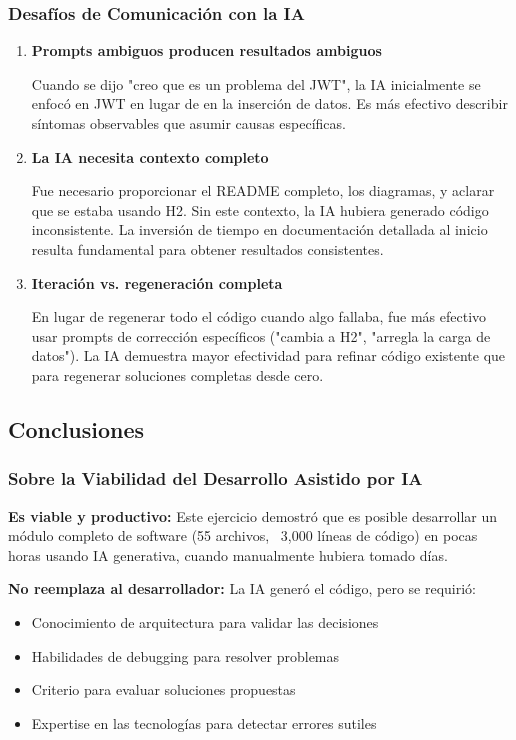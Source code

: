 \documentclass[11pt,a4paper]{article}
\begin{document}
\subsubsection{Desafíos de Comunicación con la IA}

\begin{enumerate}
    \item \textbf{Prompts ambiguos producen resultados ambiguos}
    
    Cuando se dijo "creo que es un problema del JWT", la IA inicialmente se enfocó en JWT en lugar de en la inserción de datos. Es más efectivo describir síntomas observables que asumir causas específicas.
    
    \item \textbf{La IA necesita contexto completo}
    
    Fue necesario proporcionar el README completo, los diagramas, y aclarar que se estaba usando H2. Sin este contexto, la IA hubiera generado código inconsistente. La inversión de tiempo en documentación detallada al inicio resulta fundamental para obtener resultados consistentes.
    
    \item \textbf{Iteración vs. regeneración completa}
    
    En lugar de regenerar todo el código cuando algo fallaba, fue más efectivo usar prompts de corrección específicos ("cambia a H2", "arregla la carga de datos"). La IA demuestra mayor efectividad para refinar código existente que para regenerar soluciones completas desde cero.
\end{enumerate}

\subsection{Conclusiones}

\subsubsection{Sobre la Viabilidad del Desarrollo Asistido por IA}

\textbf{Es viable y productivo:} Este ejercicio demostró que es posible desarrollar un módulo completo de software (55 archivos, ~3,000 líneas de código) en pocas horas usando IA generativa, cuando manualmente hubiera tomado días.

\textbf{No reemplaza al desarrollador:} La IA generó el código, pero se requirió:
\begin{itemize}
    \item Conocimiento de arquitectura para validar las decisiones
    \item Habilidades de debugging para resolver problemas
    \item Criterio para evaluar soluciones propuestas
    \item Expertise en las tecnologías para detectar errores sutiles
\end{itemize}
\end{document}
